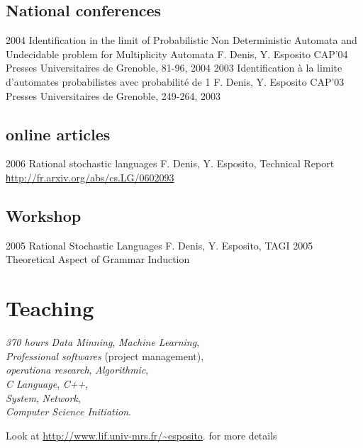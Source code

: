 \subsection*{National conferences}

\article
{2004}
{Identification in the limit of Probabilistic Non Deterministic Automata and Undecidable problem for Multiplicity Automata}
{F. Denis, Y. Esposito}
{CAP'04}
{Presses Universitaires de Grenoble, 81-96, 2004}
\article
{2003}
{Identification à la limite d'automates probabilistes avec probabilité de 1}
{F. Denis, Y. Esposito}
{CAP'03}
{Presses Universitaires de Grenoble, 249-264, 2003}

\subsection*{online articles}

\article
{2006}
{Rational stochastic languages}
{ F. Denis, Y. Esposito,}
{Technical Report}
{\href{http://fr.arxiv.org/abs/cs.LG/0602093}{\texttt http\string://fr.arxiv.org/abs/cs.LG/0602093}}

\subsection*{Workshop}

\article
{2005}
{Rational Stochastic Languages}
{F. Denis, Y. Esposito,}
{TAGI 2005}
{Theoretical Aspect of Grammar Induction}

\section*{Teaching}

{\emph{370 hours}}
{\emph{Data Minning}, \emph{Machine Learning},\\
\emph{Professional softwares} (project management),\\
\emph{operationa research}, \emph{Algorithmic},\\
\emph{C Language}, \emph{C++},\\
\emph{System}, \emph{Network},\\
\emph{Computer Science Initiation}.
}

\footnotesize{
    Look at
    \href{http://www.lif.univ-mrs.fr/~esposito} 
    {http://www.lif.univ-mrs.fr/\textasciitilde{}esposito}.
    for more details
}



